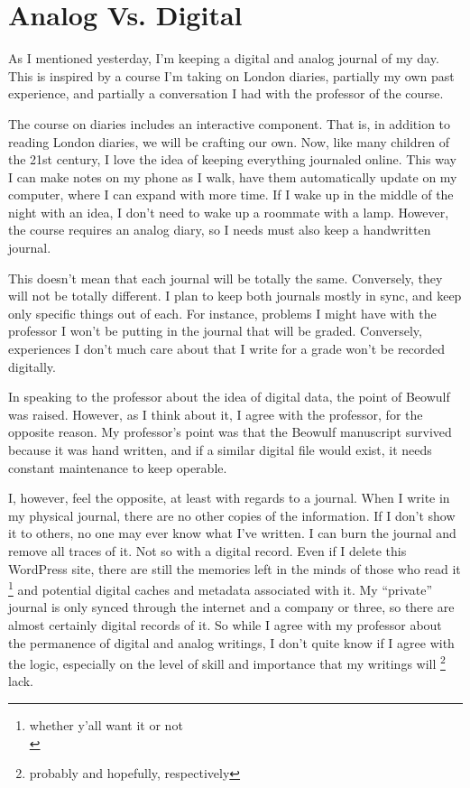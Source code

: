 \hypertarget{analog-vs-digital.html}{%
\section{Analog Vs. Digital}\label{analog-vs.-digital}}

As I mentioned yesterday,
I'm keeping a digital and analog journal of my day. This is inspired by
a course I'm taking on London diaries, partially my own past experience,
and partially a conversation I had with the professor of the course.

The course on diaries includes an interactive component. That is, in
addition to reading London diaries, we will be crafting our own. Now,
like many children of the 21st century, I love the idea of keeping
everything journaled online. This way I can make notes on my phone as I
walk, have them automatically update on my computer, where I can expand
with more time. If I wake up in the middle of the night with an idea, I
don't need to wake up a roommate with a lamp. However, the course
requires an analog diary, so I needs must also keep a handwritten
journal.

This doesn't mean that each journal will be totally the same.
Conversely, they will not be totally different. I plan to keep both
journals mostly in sync, and keep only specific things out of each. For
instance, problems I might have with the professor I won't be putting in
the journal that will be graded. Conversely, experiences I don't much
care about that I write for a grade won't be recorded digitally.

In speaking to the professor about the idea of digital data, the point
of Beowulf was raised. However, as I think about it, I agree with the
professor, for the opposite reason. My professor's point was that the
Beowulf manuscript survived because it was hand written, and if a
similar digital file would exist, it needs constant maintenance to keep
operable.

I, however, feel the opposite, at least with regards to a journal. When
I write in my physical journal, there are no other copies of the
information. If I don't show it to others, no one may ever know what
I've written. I can burn the journal and remove all traces of it. Not so
with a digital record. Even if I delete this WordPress site, there are
still the memories left in the minds of those who read it \footnote{whether
  y'all want it or not\\} and potential digital caches and metadata
associated with it. My ``private'' journal is only synced through the
internet and a company or three, so there are almost certainly digital
records of it. So while I agree with my professor about the permanence
of digital and analog writings, I don't quite know if I agree with the
logic, especially on the level of skill and importance that my writings
will \footnote{probably and hopefully, respectively} lack.
